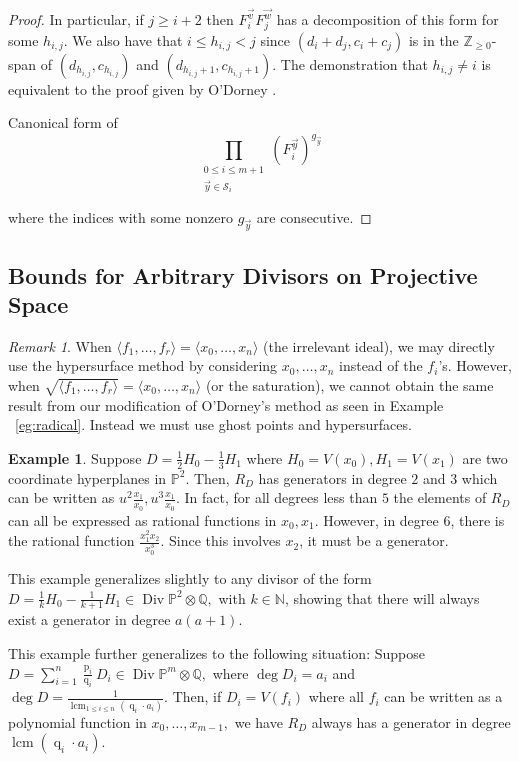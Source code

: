 \documentclass{amsart}
\theoremstyle{plain}
\theoremstyle{definition}
\newtheorem{example}[thm]{Example}
\theoremstyle{remark}
\newtheorem{rem}[thm]{Remark}
\numberwithin{equation}{section}
\newcommand\ssec{\subsection}
\newcommand\bn{{\mathbb N}}
\newcommand\bq{{\mathbb Q}}
\newcommand\bp{{\mathbb P}}
\newcommand\bz{{\mathbb Z}}
\DeclareMathOperator\di{Div}
\newcommand\bida{a}
\newcommand\mss{\mathscr{S}}
\DeclareMathOperator{\num}{p}
\DeclareMathOperator{\den}{q}
\DeclareMathOperator{\lcm}{lcm}
\begin{document}
\begin{proof}
In particular, if $j \geq i + 2$ then $F_i^{\vec{v}} F_j^{\vec{w}}$
has a decomposition of this form for some $h_{i, j}$. We also have
that $i \leq h_{i, j} < j$ since $(d_i + d_j, c_i + c_j)$ is in the
$\bz_{\geq 0}$-span of $(d_{h_{i, j}}, c_{h_{i, j}})$ and
$(d_{h_{i, j} + 1}, c_{h_{i, j} + 1})$. The demonstration that
$h_{i, j} \neq i$ is equivalent to the proof given by O'Dorney
\cite[Theorem 6]{dorney:canonical}.

Canonical form of 
\[
	\prod_{\substack{0 \leq i \leq m + 1 \\ \vec{y}
	\in \mss_i}} (F_i^{\vec{y}})^{g_{\vec{y}}}
\]

\noindent
where the indices with
some nonzero $g_{\vec{y}}$ are consecutive.
\end{proof}



\ssec{Bounds for Arbitrary Divisors on Projective Space}

\begin{rem}
When $\langle f_1, \ldots, f_r \rangle = \langle x_0, \ldots, x_n \rangle$ (the irrelevant ideal), we may directly use the hypersurface method by considering $x_0, \ldots, x_n$ instead of the $f_i$'s. However, when $\sqrt{\langle f_1, \ldots, f_r \rangle} = \langle x_0, \ldots, x_n \rangle$ (or the saturation), we cannot obtain the same result from our modification of O'Dorney's method as seen in Example ~\ref{eg:radical}. Instead we must use ghost points and hypersurfaces.
\end{rem}

\begin{example}
\label{eg:hyperplane}
Suppose $D = \frac{1}{2}H_0 - \frac{1}{3}H_1$ where $H_0 = V(x_0), H_1 = V(x_1)$ are two coordinate hyperplanes in $\bp^2$. Then, $R_D$ has generators in degree $2$ and $3$ which can be written as $u^2 \frac{x_1}{x_0}, u^3 \frac{x_1}{x_0}.$ In fact, for all degrees less than $5$ the elements of $R_D$ can all be expressed as rational functions in $x_0, x_1$. However, in degree $6$, there is the rational function $\frac{x_1^2 x_2}{x_0^3}.$ Since this involves $x_2$, it must be a generator.

This example generalizes slightly to any divisor of the form $D = \frac{1}{k}H_0 - \frac{1}{k+1}H_1 \in \di \bp^2 \otimes \bq,$ with $k \in \bn$, showing that there will always exist a generator in degree $a(a+1).$

This example further generalizes to the following situation: Suppose $D = \sum_{i=1}^{n} \frac{\num_i}{\den_i}D_i \in \di \bp^m \otimes \bq,$ where $\deg D_i = \bida_i$ and $\deg D = \frac{1}{\lcm_{1 \leq i \leq n}(\den_i \cdot \bida_i)}$. Then, if $D_i = V(f_i)$ where all $f_i$ can be written as a polynomial function in $x_0, \ldots, x_{m-1},$ we have $R_D$ always has a generator in degree $\lcm(\den_i \cdot \bida_i)$.
\end{example}
\end{document}
